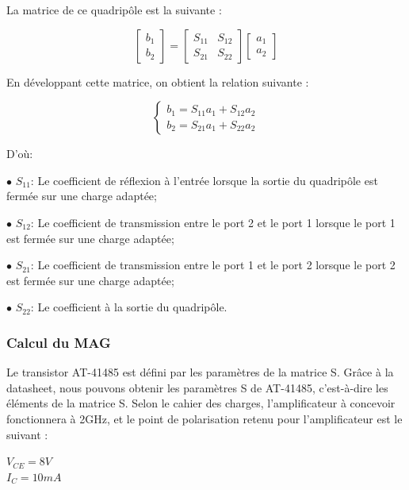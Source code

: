 \documentclass[french]{article}
\begin{document}
La matrice de ce quadripôle est la suivante :

\begin{equation}
	\begin{bmatrix}
		b_{1}\\
		b_{2}
	\end{bmatrix}
	=
	\begin{bmatrix}
		S_{11} & S_{12}\\
		S_{21} & S_{22}
	\end{bmatrix}
	\begin{bmatrix}
		a_{1}\\
		a_{2}
	\end{bmatrix}
\end{equation}

En développant cette matrice, on obtient la relation suivante :

\begin{equation}
	\left\{\begin{matrix}
		b_{1}=S_{11}a_{1}+S_{12}a_{2}\\
		b_{2}=S_{21}a_{1}+S_{22}a_{2}
	\end{matrix}\right.
	\label{eqmatrix}
\end{equation}

D’où:

$\bullet$ $S_{11}$: Le coefficient de réflexion à l’entrée lorsque la sortie du quadripôle est fermée sur une charge adaptée;

$\bullet$ $S_{12}$: Le coefficient de transmission entre le port 2 et le port 1 lorsque le port 1 est fermée sur une charge adaptée;

$\bullet$ $S_{21}$: Le coefficient de transmission entre le port 1 et le port 2 lorsque le port 2 est fermée sur une charge adaptée;

$\bullet$ $S_{22}$: Le coefficient à la sortie du quadripôle.

\subsubsection{Calcul du MAG}

Le transistor AT-41485 est défini par les paramètres de la matrice S. Grâce à la datasheet, nous pouvons obtenir les paramètres S de AT-41485, c'est-à-dire les éléments de la matrice S. Selon le cahier des charges, l'amplificateur à concevoir fonctionnera à 2GHz, et le point de polarisation retenu pour l’amplificateur est le suivant :

{\centering
	$V_{CE}=8V$\\
	$I_{C}=10mA$\\
}
\end{document}
